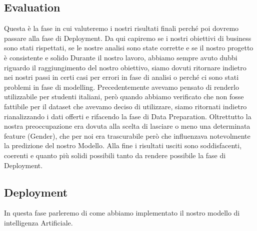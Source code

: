 \documentclass[12pt]{article}
\begin{document}
\subsection{Evaluation}
Questa è la fase in cui valuteremo i nostri risultati finali perché poi dovremo passare alla fase di Deployment. Da qui capiremo se i nostri obiettivi di business sono stati rispettati, se le nostre analisi sono state corrette e se il nostro progetto è consistente e solido
Durante il nostro lavoro, abbiamo sempre avuto dubbi riguardo il raggiungimento del nostro obiettivo, siamo dovuti ritornare indietro nei nostri passi in certi casi per errori in fase di analisi o perché ci sono stati problemi in fase di modelling.
Precedentemente avevamo pensato di renderlo utilizzabile per studenti italiani, però quando abbiamo verificato che non fosse fattibile per il dataset che avevamo deciso di utilizzare, siamo ritornati indietro rianalizzando i dati offerti e rifacendo la fase di Data Preparation.
Oltrettutto la nostra preoccupazione era dovuta alla scelta di lasciare o meno una determinata feature (Gender), che per noi era trascurabile però che influenzava notevolmente la predizione del nostro Modello. Alla fine i risultati usciti sono soddisfacenti, coerenti e quanto più solidi possibili tanto da rendere possibile la fase di Deployment.
\subsection{Deployment}
In questa fase parleremo di come abbiamo implementato il nostro modello di intelligenza Artificiale.
\end{document}
